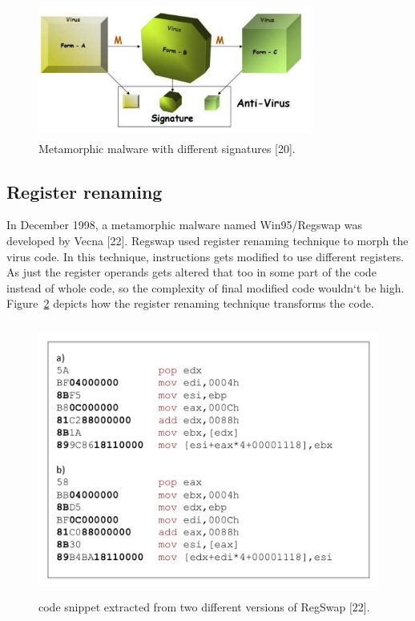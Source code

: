 \begin{figure}
  \centering
      \includegraphics[width=9cm, height=4.5cm]{aimalwarepic.png}
    \caption[Metamorphic malware with different signatures]{Metamorphic malware with different signatures [20].}
    \label{fig:aimalware}
\end{figure}

\subsection{Register renaming} 

In December 1998, a metamorphic malware named Win95/Regswap was developed by Vecna [22]. Regswap used register renaming technique to morph the virus code. In this technique, instructions gets modified to use different registers. As just the register operands gets altered that too in some part of the code instead of whole code, so the complexity of final modified code wouldn`t be high. Figure~\ref{fig:regswap} depicts how the register renaming technique transforms the code.

\begin{figure}
  \centering
      \includegraphics[width=12.9cm, height=9cm]{regswap.jpg}
    \caption[Register Renaming Example]{code snippet extracted from two different versions of RegSwap [22].}
    \label{fig:regswap}
\end{figure}

